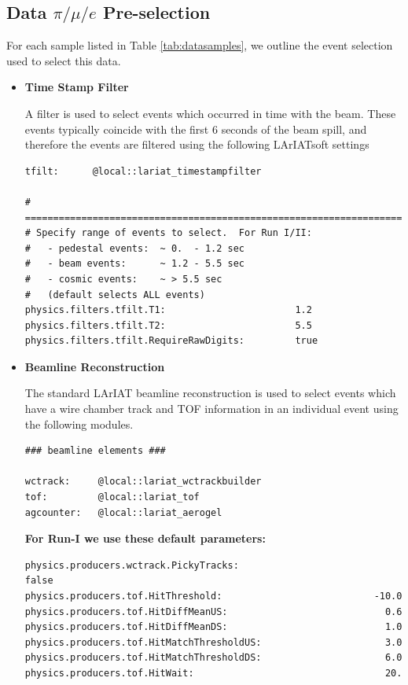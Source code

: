 \subsection{Data $\pi/\mu/e$ Pre-selection}\label{sec:DataPreSelection}
For each sample listed in Table \ref{tab:datasamples}, we outline the event selection used to select this data.

\begin{itemize}
\item \textbf{Time Stamp Filter}

A filter is used to select events which occurred in time with the beam. These events typically coincide with the first 6 seconds of the beam spill, and therefore the events are filtered using the following LArIATsoft settings

\begin{verbatim}
tfilt:      @local::lariat_timestampfilter

# ====================================================================
# Specify range of events to select.  For Run I/II:
#   - pedestal events:  ~ 0.  - 1.2 sec
#   - beam events:      ~ 1.2 - 5.5 sec
#   - cosmic events:    ~ > 5.5 sec
#   (default selects ALL events)
physics.filters.tfilt.T1:                       1.2
physics.filters.tfilt.T2:                       5.5
physics.filters.tfilt.RequireRawDigits:         true

\end{verbatim}



\item \textbf{Beamline Reconstruction}

The standard LArIAT beamline reconstruction is used to select events which have a wire chamber track and TOF information in an individual event using the following modules.
\begin{verbatim}
### beamline elements ###

wctrack:     @local::lariat_wctrackbuilder
tof:         @local::lariat_tof
agcounter:   @local::lariat_aerogel
\end{verbatim}


\textbf{For Run-I we use these default parameters:}
\begin{verbatim} 
physics.producers.wctrack.PickyTracks:                          false
physics.producers.tof.HitThreshold:                           -10.0  
physics.producers.tof.HitDiffMeanUS:                            0.6  
physics.producers.tof.HitDiffMeanDS:                            1.0  
physics.producers.tof.HitMatchThresholdUS:                      3.0  
physics.producers.tof.HitMatchThresholdDS:                      6.0  
physics.producers.tof.HitWait:                                  20.
\end{verbatim}


\end{itemize}
